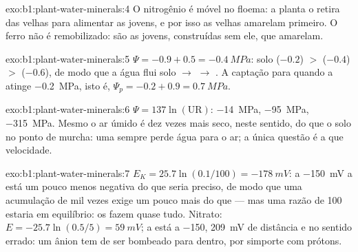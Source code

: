 \begin{solution}{exo:b1:plant-water-minerals:4}
O nitrogênio é móvel no floema: a planta o retira das  velhas
para alimentar as jovens, e por isso as  velhas amarelam
primeiro. O ferro não é remobilizado: são as  jovens,
construídas sem ele, que amarelam.
\end{solution}

\begin{solution}{exo:b1:plant-water-minerals:5}
 $\Psi = -0.9 + 0.5 = \qty{-0.4}{MPa}$: solo ($-0.2$) $>$ 
($-0.4$) $>$  ($-0.6$), de modo que a água flui solo $\to$
 $\to$ . A captação para quando a  atinge
\qty{-0.2}{MPa}, isto é, $\Psi_p = -0.2 + 0.9 = \qty{0.7}{MPa}$.
\end{solution}

\begin{solution}{exo:b1:plant-water-minerals:6}
$\Psi = 137\ln(\text{UR})$: \qty{-14}{MPa}, \qty{-95}{MPa},
\qty{-315}{MPa}. Mesmo o ar úmido é dez vezes mais seco, neste
sentido, do que o solo no ponto de murcha: uma  sempre perde água
para o ar; a única questão é a que velocidade.
\end{solution}

\begin{solution}{exo:b1:plant-water-minerals:7}
$E_K = 25.7\ln(0.1/100) = \qty{-178}{mV}$: a \qty{-150}{mV} a 
está um pouco menos negativa do que seria preciso, de modo que uma
acumulação de mil vezes exige um pouco mais do que  --- mas uma
razão de 100 estaria em equilíbrio: os  fazem quase tudo.
Nitrato: $E = -25.7\ln(0.5/5)
= \qty{+59}{mV}$; a  está a \qty{-150}{}, \qty{209}{mV} de
distância e no sentido errado: um ânion tem de ser bombeado para
dentro, por simporte com prótons.
\end{solution}

